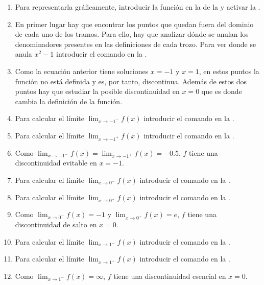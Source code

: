 \begin{enumerate}[leftmargin=*]
      \begin{indication}
      \begin{enumerate}
      \item Para representarla gráficamente, introducir la función  en la  de la  y activar la .
      \item En primer lugar hay que encontrar los puntos que quedan fuera del dominio de cada uno de los tramos.
            Para ello, hay que analizar dónde se anulan los denominadores presentes en las definiciones de cada trozo.
            Para ver donde se anula $x^2-1$ introducir el comando  en la .
      \item Como la ecuación anterior tiene soluciones $x=-1$ y $x=1$, en estos puntos la función no está definida y es, por tanto, discontinua.
            Además de estos dos puntos hay que estudiar la posible discontinuidad en $x=0$ que es donde cambia la definición de la función.
      \item Para calcular el límite $\lim_{x\rightarrow -1^-}f(x)$ introducir el comando  en la .
      \item Para calcular el límite $\lim_{x\rightarrow -1^+}f(x)$ introducir el comando  en la .
      \item Como $\lim_{x\rightarrow -1^-}f(x)=\lim_{x\rightarrow -1^+}f(x)=-0.5$, $f$ tiene una discontinuidad evitable en $x=-1$.
      \item Para calcular el límite $\lim_{x\rightarrow 0^-}f(x)$ introducir el comando  en la .
      \item Para calcular el límite $\lim_{x\rightarrow 0^+}f(x)$ introducir el comando  en la .
      \item Como $\lim_{x\rightarrow 0^-}f(x)=-1$ y $\lim_{x\rightarrow 0^+}f(x)=e$, $f$ tiene una discontinuidad de salto en $x=0$.
      \item Para calcular el límite $\lim_{x\rightarrow 1^-}f(x)$ introducir el comando  en la .
      \item Para calcular el límite $\lim_{x\rightarrow 1^+}f(x)$ introducir el comando  en la .
      \item Como $\lim_{x\rightarrow 1^-}f(x)=\infty$, $f$ tiene una discontinuidad esencial en $x=0$.
      \end{enumerate}
      \end{indication}
\end{enumerate}


